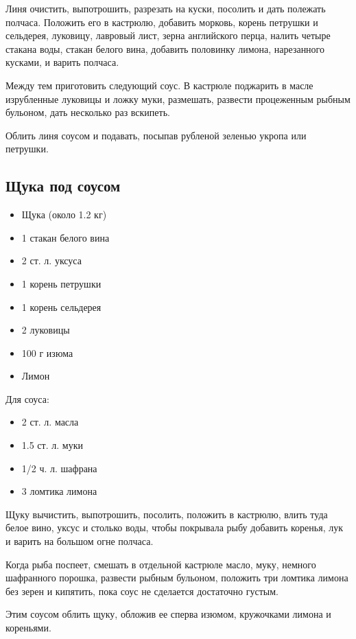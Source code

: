 Линя очистить, выпотрошить, разрезать на куски, посолить и дать полежать полчаса. Положить его в кастрюлю, добавить морковь, корень петрушки и сельдерея, луковицу, лавровый лист, зерна английского перца, налить четыре стакана воды, стакан белого вина, добавить половинку лимона, нарезанного кусками, и варить полчаса.

Между тем приготовить следующий соус. В кастрюле поджарить в масле изрубленные луковицы и ложку муки, размешать, развести процеженным рыбным бульоном, дать несколько раз вскипеть.

Облить линя соусом и подавать, посыпав рубленой зеленью укропа или петрушки.

\subsection{Щука под соусом}

\begin{itemize}
	\item Щука (около 1.2 кг)
    \item 1 стакан белого вина
    \item 2 ст. л. уксуса
    \item 1 корень петрушки
    \item 1 корень сельдерея 
    \item 2 луковицы
    \item 100 г изюма 
    \item Лимон
\end{itemize}

Для соуса: 

\begin{itemize}
	\item 2 ст. л. масла
    \item 1.5 ст. л. муки
    \item 1/2 ч. л. шафрана 
    \item 3 ломтика лимона
\end{itemize}

Щуку вычистить, выпотрошить, посолить, положить в кастрюлю, влить туда белое вино, уксус и столько воды, чтобы покрывала рыбу добавить коренья, лук и варить на большом огне полчаса.

Когда рыба поспеет, смешать в отдельной кастрюле масло, муку, немного шафранного порошка, развести рыбным бульоном, положить три ломтика лимона без зерен и кипятить, пока соус не сделается достаточно густым.

Этим соусом облить щуку, обложив ее сперва изюмом, кружочками лимона и кореньями.

